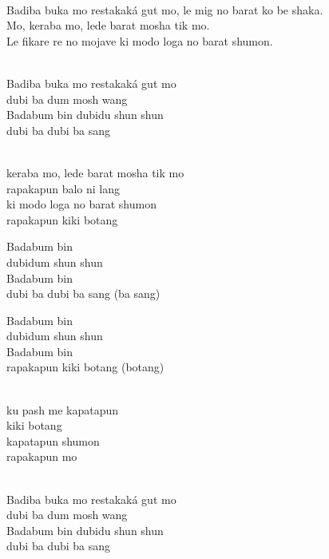 \begin{lyrics}

\\
Badiba buka mo restakaká gut mo, le mig no barat ko be shaka.\\
Mo, keraba mo, lede barat mosha tik mo.\\
Le fikare re no mojave ki modo loga no barat shumon.


\\
Badiba buka mo restakaká gut mo\\
dubi ba dum mosh wang\\
Badabum bin dubidu shun shun\\
dubi ba dubi ba sang

\\
keraba mo, lede barat mosha tik mo\\
rapakapun balo ni lang\\
ki modo loga no barat shumon\\
rapakapun kiki botang

Badabum bin\\
dubidum shun shun\\
Badabum bin\\
dubi ba dubi ba sang (ba sang)

Badabum bin\\
dubidum shun shun\\
Badabum bin\\
rapakapun kiki botang (botang)

\\
ku pash me kapatapun\\
kiki botang\\
kapatapun shumon\\
rapakapun mo



\\
Badiba buka mo restakaká gut mo\\
dubi ba dum mosh wang\\
Badabum bin dubidu shun shun\\
dubi ba dubi ba sang


\end{lyrics}

